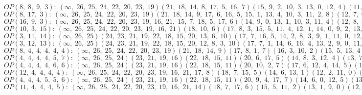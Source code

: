 $OP(8, \;8, \;9, \;3): \:(\infty, \;26, \;25, \;24, \;22, \;20, \;23, \;19)(21, \;18, \;14, \;8, \;17, \;5, \;16, \;7)(15, \;9, \;2, \;10, \;3, \;13, \;0, \;12, \;4)(11, \;6, \;1)$\\
$OP(8, \;17, \;3): \:(\infty, \;26, \;25, \;24, \;22, \;20, \;23, \;19)(21, \;18, \;14, \;9, \;17, \;6, \;16, \;5, \;15, \;1, \;13, \;4, \;10, \;3, \;11, \;2, \;8)(12, \;7, \;0)$\\
$OP(16, \;9, \;3): \:(\infty, \;26, \;25, \;24, \;22, \;20, \;23, \;19, \;16, \;21, \;15, \;7, \;18, \;5, \;17, \;6)(14, \;9, \;0, \;13, \;1, \;10, \;3, \;11, \;4)(12, \;8, \;2)$\\
$OP(10, \;3, \;15): \:(\infty, \;26, \;25, \;24, \;22, \;20, \;23, \;19, \;16, \;21)(18, \;10, \;6)(17, \;8, \;3, \;15, \;5, \;11, \;4, \;12, \;1, \;14, \;0, \;9, \;2, \;13, \;7)$\\
$OP(3, \;11, \;14): \:(\infty, \;26, \;25)(24, \;23, \;21, \;19, \;22, \;18, \;15, \;20, \;13, \;6, \;10)(17, \;7, \;16, \;5, \;14, \;2, \;8, \;3, \;9, \;1, \;11, \;0, \;12, \;4)$\\
$OP(3, \;12, \;13): \:(\infty, \;26, \;25)(24, \;23, \;21, \;19, \;22, \;18, \;15, \;20, \;12, \;8, \;3, \;10)(17, \;7, \;1, \;14, \;6, \;16, \;4, \;13, \;2, \;9, \;0, \;11, \;5)$\\
$OP(8, \;4, \;4, \;4, \;4, \;4): \:(\infty, \;26, \;25, \;24, \;22, \;20, \;23, \;19)(21, \;18, \;14, \;9)(17, \;8, \;1, \;7)(16, \;3, \;10, \;2)(15, \;5, \;13, \;4)(12, \;6, \;11, \;0)$\\
$OP(4, \;4, \;4, \;4, \;5, \;7): \:(\infty, \;26, \;25, \;24)(23, \;21, \;19, \;16)(22, \;18, \;15, \;11)(20, \;6, \;17, \;5)(14, \;8, \;3, \;12, \;4)(13, \;7, \;2, \;9, \;1, \;10, \;0)$\\
$OP(4, \;4, \;4, \;4, \;6, \;6): \:(\infty, \;26, \;25, \;24)(23, \;21, \;19, \;16)(22, \;18, \;15, \;11)(20, \;10, \;2, \;7)(17, \;6, \;12, \;4, \;14, \;5)(13, \;1, \;8, \;3, \;9, \;0)$\\
$OP(12, \;4, \;4, \;4, \;4): \:(\infty, \;26, \;25, \;24, \;22, \;20, \;23, \;19, \;16, \;21, \;17, \;8)(18, \;7, \;15, \;5)(14, \;6, \;13, \;1)(12, \;2, \;11, \;0)(10, \;4, \;9, \;3)$\\
$OP(4, \;4, \;4, \;5, \;5, \;6): \:(\infty, \;26, \;25, \;24)(23, \;21, \;19, \;16)(22, \;18, \;15, \;11)(20, \;9, \;4, \;17, \;7)(14, \;6, \;0, \;12, \;5)(13, \;3, \;8, \;2, \;10, \;1)$\\
$OP(11, \;4, \;4, \;4, \;5): \:(\infty, \;26, \;25, \;24, \;22, \;20, \;23, \;19, \;16, \;21, \;14)(18, \;7, \;17, \;6)(15, \;5, \;11, \;2)(13, \;1, \;9, \;0)(12, \;8, \;3, \;10, \;4)$\\
